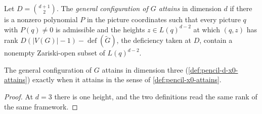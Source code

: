 \begin{definition}
  \label{def:pencil-d-x0-attains}
  \leanok
  Let $D = \binom{d+1}{2}$. The \emph{general configuration of $G$
  attains} in dimension $d$ if there is a nonzero polynomial $P$ in the
  picture coordinates such that every picture $q$ with $P(q) \neq 0$ is
  admissible and the heights $z \in L(q)^{d-2}$ at which $(q, z)$ has
  rank $D(|V(G)| - 1) - \operatorname{def}(\tilde G)$, the deficiency
  taken at $D$, contain a nonempty Zariski-open subset of $L(q)^{d-2}$.
\end{definition}

\begin{lemma}
  \label{lem:pencil-d-x0-attains-three}
  \leanok
  The general configuration of $G$ attains in dimension three
  (\cref{def:pencil-d-x0-attains}) exactly when it attains in the sense
  of \cref{def:pencil-x0-attains}.
\end{lemma}
\begin{proof}
  \leanok
  At $d = 3$ there is one height, and the two definitions read the same
  rank of the same framework.
\end{proof}

